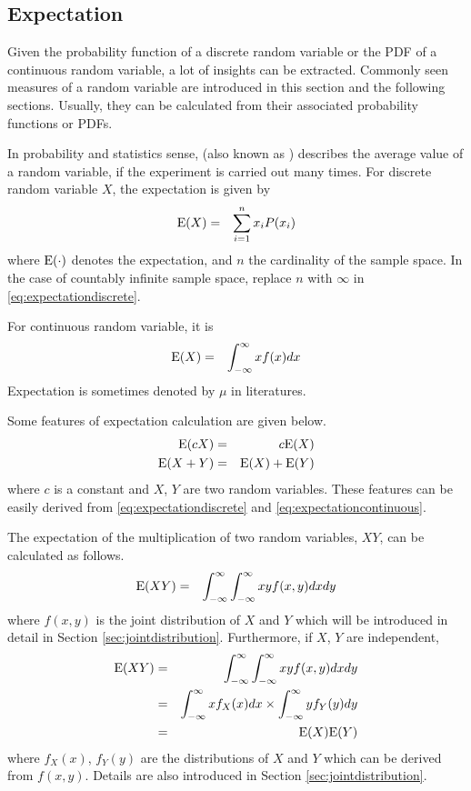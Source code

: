 \subsection{Expectation}

Given the probability function of a discrete random variable or the PDF of a continuous random variable, a lot of insights can be extracted. Commonly seen measures of a random variable are introduced in this section and the following sections. Usually, they can be calculated from their associated probability functions or PDFs.

In probability and statistics sense,  (also known as ) describes the average value of a random variable, if the experiment is carried out many times. For discrete random variable $X$, the expectation is given by
\begin{eqnarray}
	\textup{E}(X) &=& \sum_{i=1}^{n}x_iP(x_i) \label{eq:expectationdiscrete}
\end{eqnarray}
where $\textup{E}(\cdot)$ denotes the expectation, and $n$ the cardinality of the sample space. In the case of countably infinite sample space, replace $n$ with $\infty$ in \eqref{eq:expectationdiscrete}. 

For continuous random variable, it is
\begin{eqnarray}
	\textup{E}(X) &=& \int_{-\infty}^{\infty}xf(x)dx \label{eq:expectationcontinuous}
\end{eqnarray}
Expectation is sometimes denoted by $\mu$ in literatures.

Some features of expectation calculation are given below.
\begin{eqnarray}
	\textup{E}(cX) &=& c\textup{E}(X) \nonumber \\
	\textup{E}(X+Y) &=& \textup{E}(X) + \textup{E}(Y) \nonumber
\end{eqnarray}
where $c$ is a constant and $X$, $Y$ are two random variables. These features can be easily derived from \eqref{eq:expectationdiscrete} and \eqref{eq:expectationcontinuous}. 

The expectation of the multiplication of two random variables, $XY$, can be calculated as follows.
\begin{eqnarray}
	\textup{E}(XY) &=& \int_{-\infty}^{\infty}\int_{-\infty}^{\infty} xyf(x, y)dxdy \nonumber
\end{eqnarray}
where $f(x, y)$ is the joint distribution of $X$ and $Y$ which will be introduced in detail in Section \ref{sec:jointdistribution}. Furthermore, if $X$, $Y$ are independent,
\begin{eqnarray}
	\textup{E}(XY) &=& \int_{-\infty}^{\infty}\int_{-\infty}^{\infty} xyf(x, y)dxdy \nonumber \\
	&=& \int_{-\infty}^{\infty}xf_X(x)dx \times \int_{-\infty}^{\infty}yf_Y(y)dy \nonumber \\
	&=& \textup{E}(X)\textup{E}(Y) \nonumber
\end{eqnarray}
where $f_X(x)$, $f_Y(y)$ are the distributions of $X$ and $Y$ which can be derived from $f(x,y)$. Details are also introduced in Section \ref{sec:jointdistribution}.


